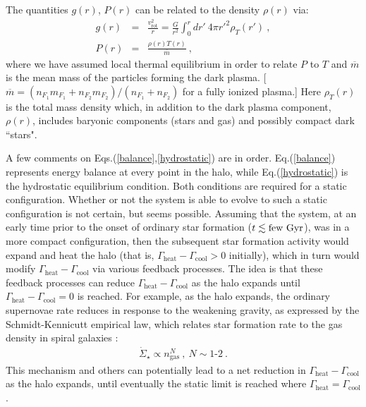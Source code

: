 \documentclass[12pt]{article}
\begin{document}
{{The quantities $g(r)$, $P(r)$ can be related to the density $\rho (r)$
via:
%
\begin{eqnarray}
g(r) &=& \frac{v _{\text{rot}} ^2}{r} = \frac{G}{r ^2} \int _0 ^r dr' \
4\pi {r'} ^2 \rho _T (r') \ , \nonumber \\
P(r) &=& \frac{\rho(r)T(r)}{\overline{m}} \ ,
\label{grhop}
\end{eqnarray}
%
where 
we have assumed local thermal equilibrium in order to relate $P$ to $T$ and
$\overline{m}$ 
is the mean mass of the particles forming the dark plasma.
[$\overline{m} = (n _{F_1}m _{F_1} + n _{F_2}m _{F_2})/(n _{F_1} + n _{F_2})$ 
for a fully ionized plasma.]
Here $\rho _T (r)$ is the total mass density which, in addition to the
dark plasma component, $\rho (r)$, includes baryonic components (stars
and gas) and possibly compact dark ``stars".

A few comments on Eqs.(\ref{balance},\ref{hydrostatic}) are in order.
Eq.(\ref{balance}) represents energy balance at every point in the halo,
while Eq.(\ref{hydrostatic}) is the hydrostatic equilibrium condition.
Both conditions are required for a static configuration. Whether or not
the system is able to evolve to such a static configuration is not
certain, but seems possible. Assuming that the system, at an early time
prior to the onset of ordinary star formation ($t \lesssim {\rm few} \
{\rm Gyr}$), was in a more compact configuration, then the subsequent
star formation activity would expand and heat the halo (that is, $\Gamma
_{\text{heat}} - \Gamma _{\text{cool}} > 0$ initially), which in turn
would modify $\Gamma _{\text{heat}}-\Gamma _{\text{cool}}$ via various
feedback processes. The idea is that these feedback processes can reduce
$\Gamma _{\text{heat}} - \Gamma _{\text{cool}}$ as the halo expands
until $\Gamma _{\text{heat}} - \Gamma _{\text{cool}} = 0$ is reached.
For example, as the halo expands, the ordinary supernovae rate reduces
in response to the weakening gravity, as expressed by the
Schmidt-Kennicutt empirical law, which relates star formation rate to
the gas density in spiral galaxies \cite{schmidt}:
%
\begin{eqnarray}
\dot{\Sigma} _{\star} \propto n _{\text{gas}} ^N \ , \ N \sim 1\text{-}2
\ .
\end{eqnarray}
%
This mechanism and others can potentially lead to a net reduction in
$\Gamma _{\text{heat}} - \Gamma _{\text{cool}}$ as the halo expands,
until eventually the static limit is reached where $\Gamma_{\text{heat}}
= \Gamma_{\text{cool}}$.

}}
\end{document}
